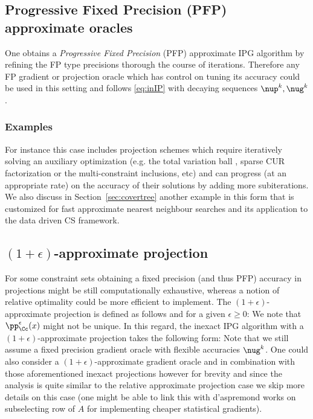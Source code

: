 \subsection{Progressive Fixed Precision (PFP) approximate oracles}\label{sec:PFP}
One obtains a \emph{Progressive Fixed Precision} (PFP) approximate IPG algorithm by refining the FP type precisions thorough the course of iterations. Therefore any FP gradient or projection oracle which has control on tuning its accuracy could be used in this setting and follows \eqref{eq:inIP} with decaying sequences $\nup^k,\nug^k$.
\subsubsection*{Examples}
For instance this case includes projection schemes which require iteratively solving an auxiliary optimization (e.g. the total variation ball \cite{TVprojGabirel}, sparse CUR factorization \cite{BachinexactIPG} or the multi-constraint inclusions\nref, etc) and can progress (at an appropriate rate) on the accuracy of their solutions by adding more subiterations. We also discuss in Section~\ref{sec:covertree} another example 
in this form that is customized for fast approximate nearest neighbour searches and its 
application to the data driven CS framework.

\subsection{$(1+\epsilon)$-approximate projection}\label{sec:epsproj}
For some constraint sets obtaining a fixed precision (and thus PFP) accuracy in projections might be still computationally exhaustive, whereas a notion of relative optimality 
could be more efficient to implement. The $(1+\epsilon)$-approximate projection is defined as follows and for a given $\epsilon\geq0$:
We note that $\pp_\Cc^{\epsilon}(x)$ might not be unique. In this regard, the inexact IPG algorithm with a $(1+\epsilon)$-approximate projection takes the following form:
Note that we still assume a fixed precision gradient oracle with flexible accuracies $\nug^k$.  
One could also consider a $(1+\epsilon)$-approximate gradient oracle and in combination with those aforementioned inexact projections however for brevity and since the analysis is quite  similar to the relative approximate projection case we skip more details on this case (one might be able to link this with d'aspremond works on subselecting row of $A$ for implementing cheaper statistical gradients).  
